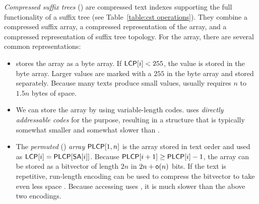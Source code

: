 \emph{Compressed suffix trees} (\CST) \cite{Sadakane2007} are compressed text
indexes supporting the full functionality of a suffix tree (see
Table~\ref{table:cst operations}). They combine a compressed suffix array, a
compressed representation of the \LCP{} array, and a compressed representation
of suffix tree topology. For the \LCP{} array, there are several common
representations:
\begin{itemize}
\item \LCPbyte{} \cite{Abouelhoda2004} stores the \LCP{} array as a byte
array. If $\mathsf{LCP}[i] < 255$, the \LCP{} value is stored in the byte array.
Larger values are marked with a $255$ in the byte array and stored separately.
Because many texts produce small \LCP{} values, \LCPbyte{} usually requires
$n$ to $1.5n$ bytes of space.
\item We can store the \LCP{} array by using variable-length codes. \LCPdac{}
uses \emph{directly addressable codes} \cite{Brisaboa2009} for the purpose,
resulting in a structure that is typically somewhat smaller and somewhat
slower than \LCPbyte.
\item The \emph{permuted} \LCP{} (\PLCP) \emph{array} \cite{Sadakane2007}
$\mathsf{PLCP}[1,n]$ is the \LCP{} array stored in text order and used as $\mathsf{LCP}[i] =
\mathsf{PLCP}[\mathsf{SA}[i]]$. Because $\mathsf{PLCP}[i+1] \ge \mathsf{PLCP}[i]-1$, the array can be
stored as a bitvector of length $2n$ in $2n+\mathsf{o}(n)$ bits. If the text is
repetitive, run-length encoding can be used to compress the bitvector to take
even less space \cite{Fischer2009a}. Because accessing \PLCP{} uses \locate,
it is much slower than the above two encodings.
\end{itemize}


